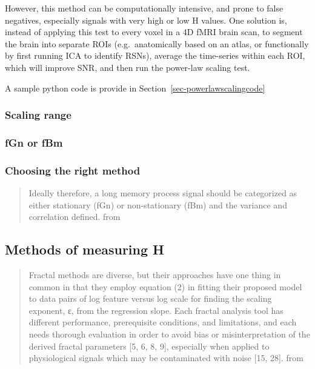 \documentclass[
  sn-vancouver,
  Numbered,
  referee,
  lineno]{sn-jnl}
\begin{document}
However, this method can be computationally intensive, and prone to
false negatives, especially signals with very high or low H values. One
solution is, instead of applying this test to every voxel in a 4D fMRI
brain scan, to segment the brain into separate ROIs (e.g.~anatomically
based on an atlas, or functionally by first running ICA to identify
RSNs), average the time-series within each ROI, which will improve SNR,
and then run the power-law scaling test.

A sample python code is provide in Section~\ref{sec-powerlawscalingcode}

\subsubsection{Scaling range}\label{scaling-range-2}

\subsubsection{fGn or fBm}\label{fgn-or-fbm-1}

\subsubsection{Choosing the right
method}\label{choosing-the-right-method-1}

\begin{quote}
Ideally therefore, a long memory process signal should be categorized as
either stationary (fGn) or non-stationary (fBm) and the variance and
correlation defined. from \citep{ekePhysiologicalTimeSeries2000}
\end{quote}

\subsection{Methods of measuring H}\label{methods-of-measuring-h-1}

\begin{quote}
Fractal methods are diverse, but their approaches have one thing in
common in that they employ equation (2) in fitting their proposed model
to data pairs of log feature versus log scale for finding the scaling
exponent, ε, from the regression slope. Each fractal analysis tool has
different performance, prerequisite conditions, and limitations, and
each needs thorough evaluation in order to avoid bias or
misinterpretation of the derived fractal parameters {[}5, 6, 8, 9{]},
especially when applied to physiological signals which may be
contaminated with noise {[}15, 28{]}. from
\citep{ekePhysiologicalTimeSeries2000}
\end{quote}
\end{document}
